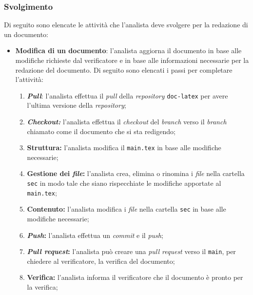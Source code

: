 \subsubsection{Svolgimento}
Di seguito sono elencate le attività che l'analista deve svolgere per la
redazione di un documento:
\begin{itemize}
	\item \textbf{Modifica di un documento}: l'analista aggiorna il documento in
	      base alle modifiche richieste dal verificatore e in base alle
	      informazioni necessarie per la redazione del documento. Di seguito sono
	      elencati i passi per completare l'attività:
	      \begin{enumerate}
		      \item \textbf{\textit{Pull}}: l'analista effettua il \textit{pull}
		            della \textit{repository} \texttt{doc-latex} per avere
		            l'ultima versione della \textit{repository};

		      \item \textbf{\textit{Checkout:}} l'analista effettua il
		            \textit{checkout} del \textit{branch} verso il
		            \textit{branch} chiamato come il documento che si sta
		            redigendo;

		      \item \textbf{Struttura:} l'analista modifica il
		            \texttt{main.tex} in base alle modifiche necessarie;

		      \item \textbf{Gestione dei \textit{file}:} l'analista crea,
		            elimina o rinomina i \textit{file} nella cartella
		            \texttt{sec} in modo tale che siano rispecchiate le
		            modifiche apportate al \texttt{main.tex};

		      \item \textbf{Contenuto:} l'analista modifica i \textit{file}
		            nella cartella \texttt{sec} in base alle modifiche
		            necessarie;

		      \item \textbf{\textit{Push}:} l'analista effettua un
		            \textit{commit} e il \textit{push};

		      \item \textbf{\textit{Pull request}:} l'analista può creare
		            una \textit{pull request} verso il \texttt{main},
		            per chiedere al verificatore, la verifica del documento;

		      \item \textbf{Verifica:} l'analista informa il verificatore
		            che il documento è pronto per la verifica;


\end{enumerate}
\end{itemize}
